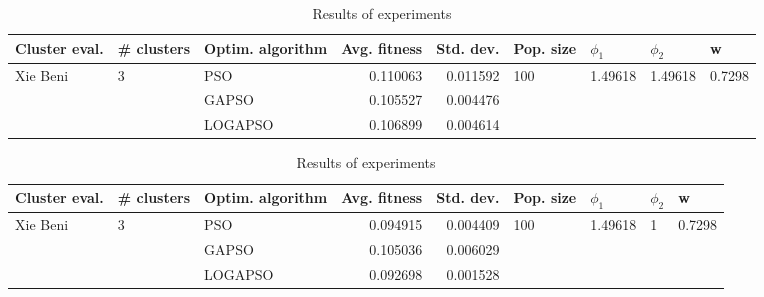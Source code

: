 \documentclass{article}
\begin{document}
\begin{table}
\centering
\caption{Results of experiments}
\begin{tabular}{lllrrllll}
\toprule
            Cluster eval. &        \# clusters & Optim. algorithm &  Avg. fitness &  Std. dev. &            Pop. size &               $\phi_{1}$ &               $\phi_{2}$ &                       w \\
\midrule
\multirow{3}{*}{Xie Beni} & \multirow{3}{*}{3} &              PSO &      0.110063 &   0.011592 & \multirow{3}{*}{100} & \multirow{3}{*}{1.49618} & \multirow{3}{*}{1.49618} & \multirow{3}{*}{0.7298} \\
                          &                    &            GAPSO &      0.105527 &   0.004476 &                      &                          &                          &                         \\
                          &                    &          LOGAPSO &      0.106899 &   0.004614 &                      &                          &                          &                         \\
\bottomrule
\end{tabular}
\end{table}
\begin{table}
\centering
\caption{Results of experiments}
\begin{tabular}{lllrrllll}
\toprule
            Cluster eval. &        \# clusters & Optim. algorithm &  Avg. fitness &  Std. dev. &            Pop. size &               $\phi_{1}$ &         $\phi_{2}$ &                       w \\
\midrule
\multirow{3}{*}{Xie Beni} & \multirow{3}{*}{3} &              PSO &      0.094915 &   0.004409 & \multirow{3}{*}{100} & \multirow{3}{*}{1.49618} & \multirow{3}{*}{1} & \multirow{3}{*}{0.7298} \\
                          &                    &            GAPSO &      0.105036 &   0.006029 &                      &                          &                    &                         \\
                          &                    &          LOGAPSO &      0.092698 &   0.001528 &                      &                          &                    &                         \\
\bottomrule
\end{tabular}
\end{table}
\end{document}
